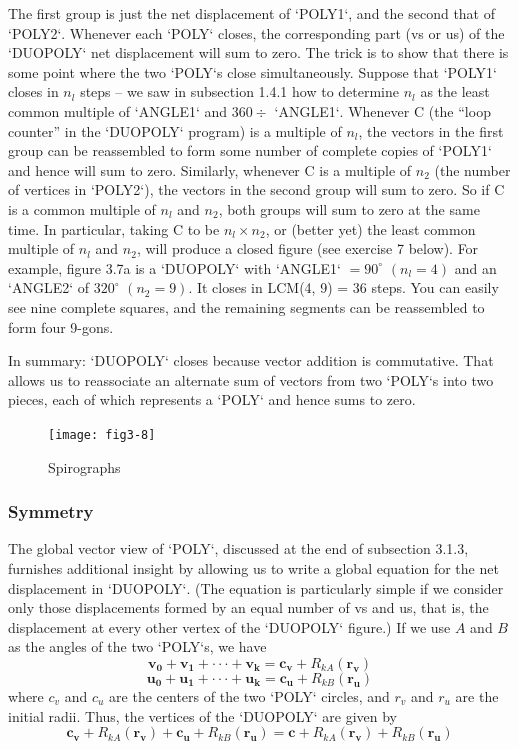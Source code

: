 \documentclass{book}
\begin{document}
The first group is just the net displacement of \textsc{`POLY1`}, and the second
that of \textsc{`POLY2`}. Whenever each \textsc{`POLY`} closes, the corresponding part (vs
or us) of the \textsc{`DUOPOLY`} net displacement will sum to zero. The trick is to
show that there is some point where the two \textsc{`POLY`}s close simultaneously.
Suppose that \textsc{`POLY1`} closes in $n_l$ steps -- we saw in subsection 1.4.1
how to determine $n_l$ as the least common multiple of \textsc{`ANGLE1`} and $360 \div$
\textsc{`ANGLE1`}. Whenever C (the ``loop counter'' in the \textsc{`DUOPOLY`} program) is
a multiple of $n_l$, the vectors in the first group can be reassembled to
form some number of complete copies of \textsc{`POLY1`} and hence will sum to
zero. Similarly, whenever C is a multiple of $n_2$ (the number of vertices
in \textsc{`POLY2`}), the vectors in the second group will sum to zero. So if C is
a common multiple of $n_l$ and $n_2$, both groups will sum to zero at the
same time. In particular, taking C to be $n_l \times n_2$, or (better yet) the least
common multiple of $n_l$ and $n_2$, will produce a closed figure (see exercise
7 below). For example, figure 3.7a is a \textsc{`DUOPOLY`} with \textsc{`ANGLE1`} $= 90^{\circ}$
$(n_l = 4)$ and an \textsc{`ANGLE2`} of $320^{\circ}$ $(n_2 = 9)$. It closes in LCM(4, 9) =
36 steps. You can easily see nine complete squares, and the remaining
segments can be reassembled to form four 9-gons.

In summary: \textsc{`DUOPOLY`} closes because vector addition is commutative.
That allows us to reassociate an alternate sum of vectors from two \textsc{`POLY`}s
into two pieces, each of which represents a \textsc{`POLY`} and hence sums to zero.

\begin{figure}
\begin{center}
\texttt{[image: fig3-8]}
\caption{Spirographs}
\end{center}
\end{figure}

\subsubsection{Symmetry}
The global vector view of \textsc{`POLY`}, discussed at the end of subsection 3.1.3,
furnishes additional insight by allowing us to write a global equation for
the net displacement in \textsc{`DUOPOLY`}. (The equation is particularly simple if
we consider only those displacements formed by an equal number of vs
and us, that is, the displacement at every other vertex of the \textsc{`DUOPOLY`}
figure.) If we use $A$ and $B$ as the angles of the two \textsc{`POLY`}s, we have
$$\mathbf{v_0}+\mathbf{v_1}+\cdot \cdot \cdot +\mathbf{v_k} = \mathbf{c_v}+R_{kA}(\mathbf{r_v})$$
$$\mathbf{u_0}+\mathbf{u_1}+\cdot \cdot \cdot +\mathbf{u_k} = \mathbf{c_u}+R_{kB}(\mathbf{r_u})$$
\noindent where \textbf{$c_v$} and \textbf{$c_u$} are the centers of the two \textsc{`POLY`} circles, and \textbf{$r_v$} and \textbf{$r_u$} are the initial radii. Thus, the vertices of the \textsc{`DUOPOLY`} are given by
$$\mathbf{c_v} + R_{kA}(\mathbf{r_v}) + \mathbf{c_u} + R_{kB}(\mathbf{r_u}) = \mathbf{c} + R_{kA}(\mathbf{r_v}) + R_{kB}(\mathbf{r_u})$$
\end{document}
